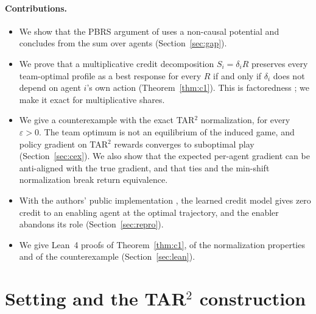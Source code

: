 \documentclass[11pt]{article}
\theoremstyle{remark}
\begin{document}
\paragraph{Contributions.}
\begin{itemize}
\item We show that the PBRS argument of \citet[Prop.~3.1]{kapoor2025tar2} uses a non-causal potential and concludes from the sum over agents (Section~\ref{sec:gap}).
\item We prove that a multiplicative credit decomposition $S_i=\delta_iR$ preserves every team-optimal profile as a best response for every $R$ if and only if $\delta_i$ does not depend on agent $i$'s own action (Theorem~\ref{thm:c1}). This is factoredness \citep{wolpert1999coin}; we make it exact for multiplicative shares.
\item We give a counterexample with the exact TAR$^2$ normalization, for every $\varepsilon>0$. The team optimum is not an equilibrium of the induced game, and policy gradient on TAR$^2$ rewards converges to suboptimal play (Section~\ref{sec:cex}). We also show that the expected per-agent gradient can be anti-aligned with the true gradient, and that ties and the min-shift normalization break return equivalence.
\item With the authors' public implementation \citep{kapoor2024code}, the learned credit model gives zero credit to an enabling agent at the optimal trajectory, and the enabler abandons its role (Section~\ref{sec:repro}).
\item We give Lean~4 proofs of Theorem~\ref{thm:c1}, of the normalization properties and of the counterexample (Section~\ref{sec:lean}).
\end{itemize}

\section{Setting and the TAR$^2$ construction}
\end{document}
